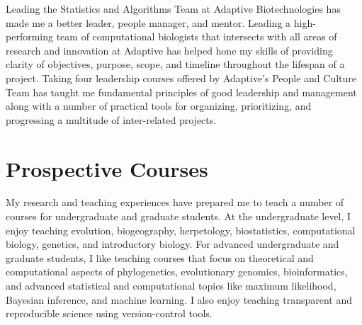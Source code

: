 Leading the Statistics and Algorithms Team at Adaptive Biotechnologies has made
me a better leader, people manager, and mentor.
Leading a high-performing team of computational biologists that intersects with
all areas of research and innovation at Adaptive has helped hone my skills of
providing clarity of objectives, purpose, scope, and timeline throughout the
lifespan of a project.
Taking four leadership courses offered by Adaptive's People and Culture Team
has taught me fundamental principles of good leadership and management along
with a number of practical tools for organizing, prioritizing, and progressing
a multitude of inter-related projects.


\section*{Prospective Courses}


My research and teaching experiences have prepared me to teach a number of
courses for undergraduate and graduate students.
At the undergraduate level, I enjoy teaching
evolution,
biogeography,
herpetology,
biostatistics,
computational biology,
genetics,
and
introductory biology.
For advanced undergraduate and graduate students, I like teaching courses
that focus on theoretical and computational aspects of
phylogenetics,
evolutionary genomics,
bioinformatics,
and
advanced statistical and computational topics like
maximum likelihood,
Bayesian inference,
and
machine learning.
I also enjoy teaching transparent and reproducible science using version-control tools.

